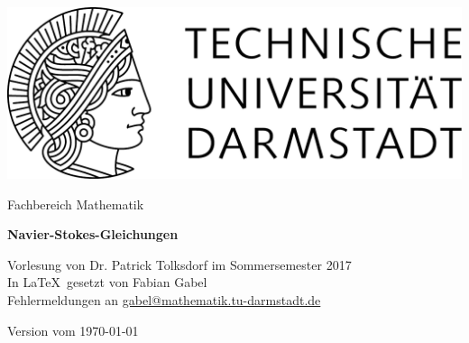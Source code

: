 \documentclass[11pt,a4paper,leqno]{report}
\begin{document}
\hypersetup{pageanchor=false}
\begin{titlepage}
  \begin{center}
    \vspace{1cm}
    \includegraphics[width=0.5\linewidth]{TU_Darmstadt_Logo.pdf}
    \vspace{1cm}
    
    \large{Fachbereich Mathematik}
    \vspace{3.5cm}
    
    \Huge{\textbf{Navier-Stokes-Gleichungen}}
    
    \vspace*{1cm}    
    \large{Vorlesung von Dr. Patrick Tolksdorf im Sommersemester 2017\\}
    \vspace*{1.0cm}
    \small{In \LaTeX\ gesetzt von Fabian Gabel\\}
    \small{Fehlermeldungen an \url{gabel@mathematik.tu-darmstadt.de}}

    \vspace*{\fill}
    \small{Version vom \today}
  \end{center}
\end{titlepage}

\hypersetup{pageanchor=true}
\tableofcontents







\end{document}
